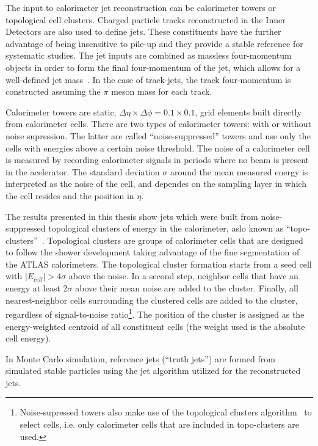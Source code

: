 The input to calorimeter jet reconstruction can be calorimeter towers or topological cell clusters. Charged particle tracks reconstructed in the Inner Detectors are also used to define jets. These constituents have the further advantage of being insensitive to pile-up and they provide a stable reference for systematic studies. The jet inputs are combined as massless four-momentum objects in order to form the final four-momentum of the jet, which allows for a well-defined jet mass~\cite{Busato:1271710}. In the case of track-jets, the track four-momentum is constructed assuming the $\pi$ meson mass for each track.

Calorimeter towers are static, $\Delta \eta \times \Delta \phi = 0.1 \times 0.1$, grid elements built directly from calorimeter cells. There are two types of calorimeter towers: with or without noise supression. The latter are called ``noise-suppressed'' towers and use only the cells with energies above a certain noise threshold.  The noise of a calorimeter cell is measured by recording calorimeter signals in periods where no beam is present in the acelerator.  The standard deviation $\sigma$ around the mean measured energy is interpreted as the noise of the cell, and dependes on the sampling layer in which the cell resides and the position in $\eta$.

The results presented in this thesis show jets which were built from noise-suppressed topological clusters of energy in the calorimeter, aslo known as ``topo-clusters''~\cite{topoClusters}. Topological clusters are groups of calorimeter cells that are designed to follow the shower development taking advantage of the fine segmentation of the ATLAS calorimeters. The topological cluster formation starts from a seed cell with $|E_{cell}| > 4 \sigma$ above the noise. In a second step, neighbor cells that have an energy at least 2$\sigma$ above their mean noise are added to the cluster. Finally, all nearest-neighbor cells surrounding the clustered cells are added to the cluster, regardless of signal-to-noise ratio\footnote{Noise-supressed towers also make use of the topological clusters algorithm~\cite{topoClusters} to select cells, i.e. only calorimeter cells that are included in topo-clusters are used.}. The position of the cluster is assigned as the energy-weighted centroid of all constituent cells (the weight used is the absolute cell energy).

In Monte Carlo simulation, reference jets (``truth jets'') are formed from simulated stable particles using the jet algorithm utilized for the reconstructed jets. 

